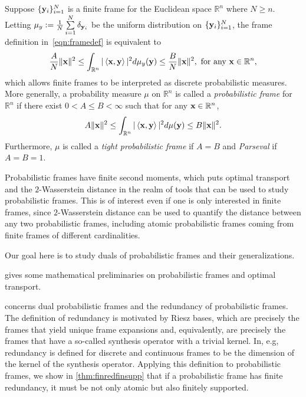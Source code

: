 \documentclass{amsart}
\numberwithin{equation}{section}
\theoremstyle{plain}
\theoremstyle{remark}
\theoremstyle{definition}
\begin{document}
Suppose $\{{\bf y}_i\}_{i=1}^N$ is a finite frame for the Euclidean space $\mathbb{R}^n$ where $N \geq n$. Letting $\mu_y := \frac{1}{N} \sum\limits_{i=1}^N   \delta_{{\bf y}_i}$ be the uniform distribution on $\{{\bf y}_i\}_{i=1}^N$,  the frame definition in~\eqref{eqn:framedef} is equivalent to 
\begin{equation*}
    \frac{A}{N} \Vert {\bf x}  \Vert^2 \leq\int_{\mathbb{R}^n} \vert \left\langle {\bf x},{\bf y} \right\rangle \vert ^2 d\mu_y({\bf y})  \leq \frac{B}{N} \Vert {\bf x}  \Vert^2, \ \text{for any} \ {\bf x} \in \mathbb{R}^n,
\end{equation*}
which allows finite frames to be interpreted as discrete probabilistic measures. 
More generally, a probability measure $\mu$ on $\mathbb{R}^n$ is called a \emph{probabilistic frame} for $\mathbb{R}^n$ if there exist $0<A \leq B < \infty$ such that for any ${\bf x} \in \mathbb{R}^n$, 
\begin{equation*}
    A \Vert {\bf x}  \Vert^2 \leq\int_{\mathbb{R}^n} \vert \left\langle {\bf x},{\bf y} \right\rangle \vert ^2 d\mu({\bf y})  \leq B \Vert {\bf x}  \Vert^2.
\end{equation*}
Furthermore, $\mu$ is called a \emph{tight probabilistic frame} if $A = B$ and \emph{Parseval} if $A = B=1$. 

Probabilistic frames have finite second moments, which puts optimal transport and the $2$-Wasserstein distance in the realm of tools that can be used to study probabilistic frames. This is of interest even if one is only interested in finite frames, since $2$-Wasserstein distance can be used to quantify the distance between any two probabilistic frames, including atomic probabilistic frames coming from finite frames of different cardinalities.

Our goal here is to study duals of probabilistic frames and their generalizations.

 gives some mathematical preliminaries on probabilistic frames and optimal transport.

 concerns dual probabilistic frames and the redundancy of probabilistic frames. The definition of redundancy is motivated by Riesz bases, which are precisely the frames that yield unique frame expansions and, equivalently, are precisely the frames that have a so-called synthesis operator with a trivial kernel. In, e.g, \cite{hemmat2001generalized, balan2003deficits,hosseini2013structure,jakobsen2016density, speckbacher2019frames} redundancy is defined for discrete and continuous frames to be the dimension of the kernel of the synthesis operator. Applying this definition to probabilistic frames, we show in \cref{thm:finredfinsupp} that if a probabilistic frame has finite redundancy, it must be not only atomic but also finitely supported.
\end{document}
